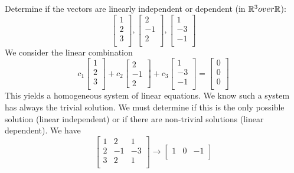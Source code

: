 \documentclass{article}
\begin{document}
\begin{example}
  Determine if the vectors are linearly independent or dependent (in $\mathbb{R}^3 over \mathbb{R}$):
  \[
    \begin{bmatrix}
      1\\2\\3\\
    \end{bmatrix},
    \begin{bmatrix}
      2\\-1\\2\\
    \end{bmatrix},
    \begin{bmatrix}
      1\\-3\\-1\\
    \end{bmatrix}
  \]
  We consider the linear combination
  \[
    c_1
    \begin{bmatrix}
      1\\2\\3\\
    \end{bmatrix} + c_2
    \begin{bmatrix}
      2\\-1\\2
    \end{bmatrix} + c_3
    \begin{bmatrix}
      1\\-3\\-1\\
    \end{bmatrix}
    =
    \begin{bmatrix}
      0\\0\\0\\
    \end{bmatrix}
  \]
  This yields a homogeneous system of linear equations. We know such a system has always the trivial solution. We must determine if this is the only possible solution (linear independent) or if there are non-trivial solutions (linear dependent). We have
  \[
    \begin{bmatrix}
      1 & 2 & 1\\
      2 & -1 & -3\\
      3 & 2 & 1\\
    \end{bmatrix}\to
    \begin{bmatrix}
      1 & 0 & -1\\

\end{bmatrix}\]
\end{example}
\end{document}
